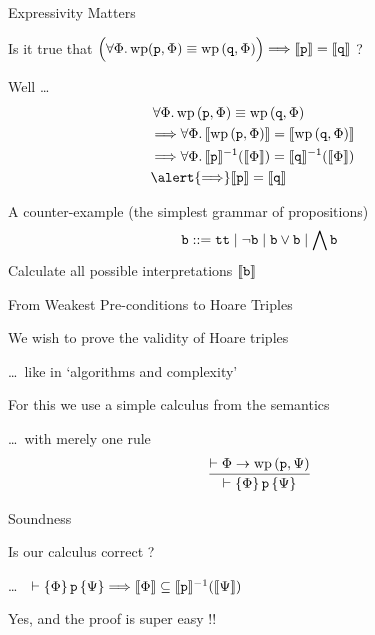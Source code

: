 \documentclass{beamer}
\begin{document}
\begin{frame}{Expressivity Matters}

Is it true that $\Big ( \forall \Phi. \, \mathrm{wp}(\mathtt{p}, \Phi)
\equiv \mathrm{wp} \,(\mathtt{q}, \Phi) \Big ) \Longrightarrow \llbracket \mathtt{p} \rrbracket =
\llbracket \mathtt{q} \rrbracket$ ? 

\pause
\bigskip
Well \dots
\vspace{-0.3cm}
\begin{align*}
        & \, \forall \Phi. \, \mathrm{wp} \, (\prog{p}, \Phi) \equiv \mathrm{wp} \, (\prog{q}, \Phi)
        \\
        & \Longrightarrow 
        \forall \Phi. \, \sem{\mathrm{wp} \, (\prog{p}, \Phi)} = \sem{\mathrm{wp} \, (\prog{q}, \Phi)}
        \\
        & \Longrightarrow 
        \forall \Phi. \, \sem{\prog{p}}^{-1}(\sem{\Phi}) = \sem{\prog{q}}^{-1}(\sem{\Phi}) 
        &
        \\
        & \alert{\Longrightarrow} 
        \sem{\prog{p}} = \sem{\prog{q}} 
\end{align*}
\pause
\vspace{-0.5cm}
\begin{block}{A counter-example (the simplest grammar of propositions) }
        \[
                \mathtt{b} :: = \mathtt{tt} \mid \mathtt{\neg b} \mid \mathtt{b \vee b}
                \mid \bigwedge \mathtt{b}
        \]
        Calculate all possible interpretations $\llbracket \mathtt{b} \rrbracket$
\end{block}
\end{frame}

\begin{frame}{From Weakest Pre-conditions to Hoare Triples}

        We wish to prove the validity of Hoare triples

        \dots \, like in `algorithms and complexity'

        \bigskip
        For this we use a simple calculus from the semantics

        \dots \, with merely one rule
        \[
                \infer{\vdash \{ \Phi \} \, \prog{p} \, \{ \Psi \}}
                { \vdash \Phi \rightarrow \mathrm{wp} \, (\prog{p}, \Psi) }
        \]
\end{frame}

\begin{frame}{Soundness}

        Is our calculus correct ?

        \dots \, \ie\  $\vdash \{ \Phi \} \, \mathtt{p} \, \{ \Psi \} \Longrightarrow
        \llbracket \Phi \rrbracket \subseteq \llbracket \mathtt{p} \rrbracket^{-1}(\llbracket \Psi \rrbracket)$

        \pause
        \bigskip
        Yes, and the proof is super easy !!
\end{frame}
\end{document}
